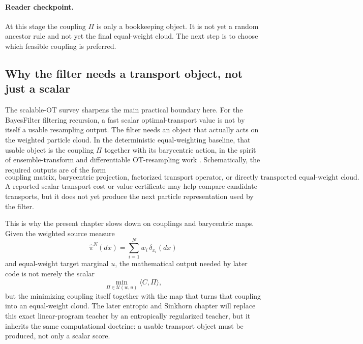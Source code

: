 \paragraph{Reader checkpoint.}
At this stage the coupling \(\Pi\) is only a bookkeeping object.  It is not yet a
random ancestor rule and not yet the final equal-weight cloud.  The next step is
to choose which feasible coupling is preferred.

\subsection{Why the filter needs a transport object, not just a scalar}
\label{sec:bf-ot-baseline-transport-object}

The scalable-OT survey sharpens the main practical boundary here.  For the
BayesFilter filtering recursion, a fast scalar optimal-transport value is not by
itself a usable resampling output.  The filter needs an object that actually acts
on the weighted particle cloud.  In the deterministic equal-weighting baseline,
that usable object is the coupling \(\Pi\) together with its barycentric action,
in the spirit of ensemble-transform and differentiable OT-resampling work
\citep{reich2013nonparametric,corenflos2021differentiable}.
Schematically, the required outputs are of the form
\begin{equation}
\label{eq:bf-ot-baseline-usable-object}
  \text{coupling matrix, barycentric projection, factorized transport operator,}
  \text{ or directly transported equal-weight cloud.}
\end{equation}
A reported scalar transport cost or value certificate may help compare candidate
transports, but it does not yet produce the next particle representation used by
the filter.

This is why the present chapter slows down on couplings and barycentric maps.
Given the weighted source measure
\begin{equation}
\label{eq:bf-ot-baseline-source-measure-repeat}
  \hat\pi^N(dx)
  =
  \sum_{i=1}^N w_i\,\delta_{x_i}(dx)
\end{equation}
and equal-weight target marginal \(u\), the mathematical output needed by later
code is not merely the scalar
\begin{equation}
\label{eq:bf-ot-baseline-scalar-only}
  \min_{\Pi\in\mathcal U(w,u)} \langle C,\Pi\rangle,
\end{equation}
but the minimizing coupling itself together with the map that turns that coupling
into an equal-weight cloud.  The later entropic and Sinkhorn chapter will replace
this exact linear-program teacher by an entropically regularized teacher, but it
inherits the same computational doctrine: a usable transport object must be
produced, not only a scalar score.


